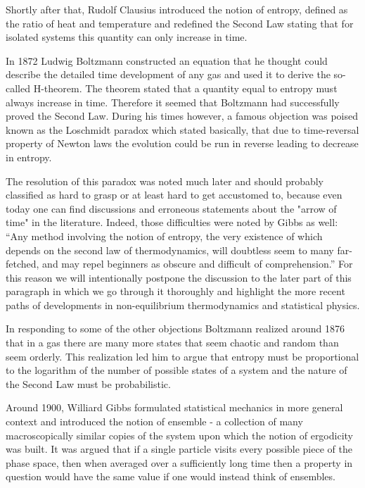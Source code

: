\documentclass[a4paper,12pt]{article}
\begin{document}
Shortly after that, Rudolf Clausius introduced the notion of entropy, defined as the ratio of heat and temperature and redefined the Second Law stating that for isolated systems this quantity can only increase in time.

In 1872 Ludwig Boltzmann constructed an equation that he thought could describe the detailed time development of any gas and used it to derive the so-called H-theorem. The theorem stated that a quantity equal to entropy must always increase in time. Therefore it seemed that Boltzmann had successfully proved the Second Law. During his times however, a famous objection was poised known as the Loschmidt paradox which stated basically, that due to time-reversal property of Newton laws the evolution could be run in reverse leading to decrease in entropy. 

The resolution of this paradox was noted much later and should probably classified as hard to grasp or at least hard to get accustomed to, because even today one can find discussions and erroneous statements about the "arrow of time" in the literature. Indeed, those difficulties were noted by Gibbs as well\cite{Gibbs:1928tw}:
“Any method involving the notion of entropy, the very existence of which depends on the second law of thermodynamics, will doubtless seem to many far-fetched, and may repel beginners as obscure and difficult of comprehension.” 
For this reason we will intentionally postpone the discussion to the later part of this paragraph in which we go through it thoroughly and highlight the more recent paths of developments in non-equilibrium thermodynamics and statistical physics.

In responding to some of the other objections Boltzmann realized around 1876 that in a gas there are many more states that seem chaotic and random than seem orderly. This realization led him to argue that entropy must be proportional to the logarithm of the number of possible states of a system and the nature of the Second Law must be probabilistic.

Around 1900, Williard Gibbs formulated statistical mechanics in more general context and introduced the notion of ensemble - a collection of many macroscopically similar copies of the system upon which the notion of ergodicity was built. 
It was argued that if a single particle visits every possible piece of the phase space, then when averaged over a sufficiently long time then a property in question would have the same value if one would instead think of ensembles. 
\end{document}
